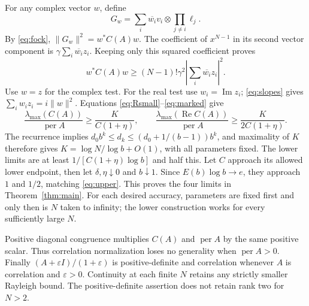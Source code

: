 \documentclass[11pt]{article}
\DeclareMathOperator{\per}{per}
\DeclareMathOperator{\Ree}{Re}
\DeclareMathOperator{\Imm}{Im}
\begin{document}
For any complex vector $w$, define
\[
 G_w=\sum_i\overline{w_i}v_i\otimes\prod_{j\ne i}\ell_j.
\]
By \eqref{eq:fock}, $\|G_w\|^2=w^*C(A)w$. The coefficient of $x^{N-1}$ in
its second vector component is $\gamma\sum_i\overline{w_i}z_i$. Keeping only
this squared coefficient proves
\begin{equation}\label{eq:marked}
 w^*C(A)w\ge(N-1)!\gamma^2
                  \left|\sum_i\overline{w_i}z_i\right|^2.
\end{equation}
Use $w=z$ for the complex test. For the real test use $w_i=\Imm z_i$;
\eqref{eq:slopes} gives $\sum_iw_iz_i=i\|w\|^2$. Equations
\eqref{eq:Rsmall}--\eqref{eq:marked} give
\[
 \frac{\lambda_{\max}(C(A))}{\per A}\ge\frac{K}{C(1+\eta)},\qquad
 \frac{\lambda_{\max}(\Ree C(A))}{\per A}\ge\frac{K}{2C(1+\eta)}.
\]
The recurrence implies
$d_0b^k\le d_k\le(d_0+1/(b-1))b^k$, and maximality of $K$ therefore gives
$K=\log N/\log b+O(1)$, with all parameters fixed. The lower limits are at
least $1/[C(1+\eta)\log b]$ and half this. Let $C$ approach its allowed lower
endpoint, then let $\delta,\eta\downarrow0$ and $b\downarrow1$. Since
$E(b)\log b\to e$, they approach $1$ and $1/2$, matching \eqref{eq:upper}.
This proves the four limits in Theorem~\ref{thm:main}. For each desired accuracy,
parameters are fixed first and only then is $N$ taken to infinity; the lower
construction works for every sufficiently large $N$.

Positive diagonal congruence multiplies $C(A)$ and $\per A$ by the same
positive scalar. Thus correlation normalization loses no generality when
$\per A>0$. Finally $(A+\varepsilon I)/(1+\varepsilon)$ is positive-definite
and correlation whenever $A$ is correlation and $\varepsilon>0$. Continuity
at each finite $N$ retains any strictly smaller Rayleigh bound. The
positive-definite assertion does not retain rank two for $N>2$.
\end{document}
